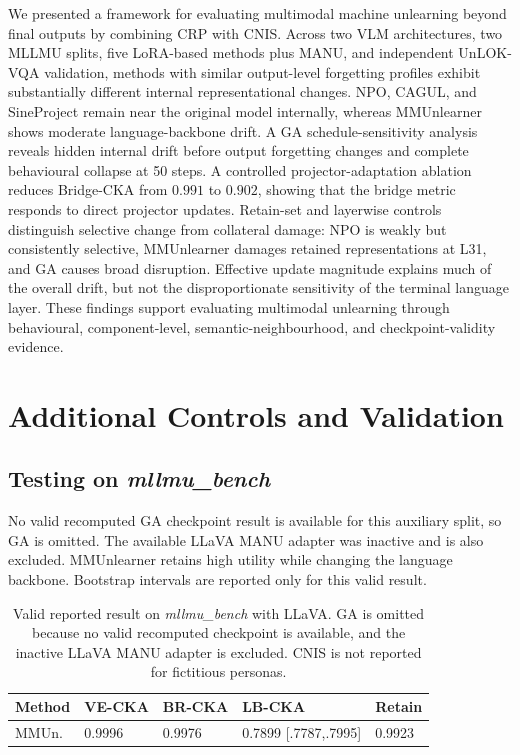 \documentclass[letterpaper]{article}
\begin{document}
We presented a framework for evaluating multimodal machine unlearning beyond
final outputs by combining CRP with CNIS. Across two VLM architectures, two
MLLMU splits, five LoRA-based methods plus MANU, and independent UnLOK-VQA
validation, methods with similar output-level forgetting profiles exhibit
substantially different internal representational changes. NPO, CAGUL, and
SineProject remain near the original model internally, whereas MMUnlearner
shows moderate language-backbone drift. A GA schedule-sensitivity analysis reveals hidden
internal drift before output forgetting changes and complete behavioural
collapse at 50 steps. A controlled projector-adaptation ablation reduces
Bridge-CKA from $0.991$ to $0.902$, showing that the bridge metric responds
to direct projector updates. Retain-set and layerwise controls distinguish
selective change from collateral damage: NPO is weakly but consistently
selective, MMUnlearner damages retained representations at L31, and GA causes
broad disruption. Effective update magnitude explains much of the overall
drift, but not the disproportionate sensitivity of the terminal language
layer. These findings support evaluating multimodal unlearning through
behavioural, component-level, semantic-neighbourhood, and checkpoint-validity
evidence.



\clearpage
\appendix

\section{Additional Controls and Validation}

\subsection{Testing on \emph{mllmu\_bench}}
\label{app:bench}

No valid recomputed GA checkpoint result is available for this auxiliary
split, so GA is omitted. The available LLaVA MANU adapter was inactive and
is also excluded. MMUnlearner retains high utility while changing the
language backbone. Bootstrap intervals are reported only for this valid
result.

\begin{table}[h]
\centering
\caption{Valid reported result on \emph{mllmu\_bench} with LLaVA.
GA is omitted because no valid recomputed checkpoint is available, and the
inactive LLaVA MANU adapter is excluded. CNIS is not reported for fictitious
personas.}
\label{tab:bench_appendix}
\setlength{\tabcolsep}{3pt}
\scriptsize
\begin{tabular}{lllll}
\toprule
\textbf{Method} & \textbf{VE-CKA} & \textbf{BR-CKA}
& \textbf{LB-CKA} & \textbf{Retain} \\
\midrule
MMUn.
& 0.9996 & 0.9976 & 0.7899 [.7787,.7995] & 0.9923 \\
\bottomrule
\end{tabular}
\end{table}
\end{document}
